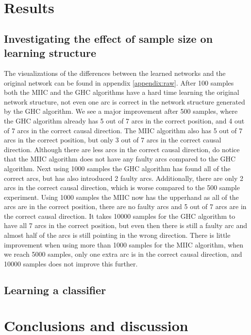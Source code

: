 \documentclass{article}
\begin{document}
\section{Results}
\subsection{Investigating the effect of sample size on learning structure}
The visualizations of the differences between the learned networks and the original network can be found in appendix \ref{appendix:raw}.
After 100 samples both the MIIC and the GHC algorithms have a hard time learning the original network structure, 
not even one arc is correct in the network structure generated by the GHC algorithm.
We see a major improvement after 500 samples, where the GHC algorithm already has 5 out of 7 arcs in the correct position, and 4 out of 7 arcs in the correct causal direction.
The MIIC algorithm also has 5 out of 7 arcs in the correct position, but only 3 out of 7 arcs in the correct causal direction. 
Although there are less arcs in the correct causal direction, do notice that the MIIC algorithm does not have any faulty arcs compared to the GHC algorithm.
Next using 1000 samples the GHC algorithm has found all of the correct arcs, but has also introduced 2 faulty arcs. Additionally, there are only 2 arcs in the correct causal direction, which is worse compared to the 500 sample experiment. 
Using 1000 samples the MIIC now has the upperhand as all of the arcs are in the correct position, there are no faulty arcs and 5 out of 7 arcs are in the correct causal direction.
It takes 10000 samples for the GHC algorithm to have all 7 arcs in the correct position, but even then there is still a faulty arc and almost half of the arcs is still pointing in the wrong direction.
There is little improvement when using more than 1000 samples for the MIIC algorithm, when we reach 5000 samples, only one extra arc is in the correct causal direction, and 10000 samples does not improve this further.
\subsection{Learning a classifier}

\section{Conclusions and discussion}
\end{document}
